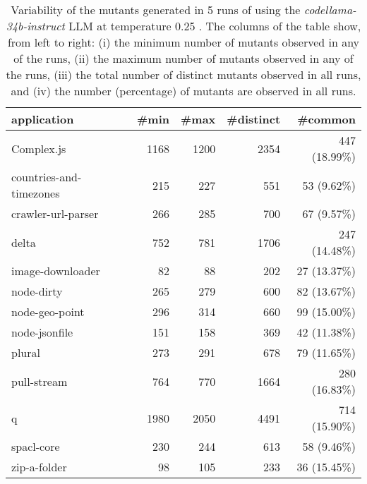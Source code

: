 
\begin{table}[hbt!]
\centering
{\footnotesize
\begin{tabular}{l|r|r|r|r}

{\bf application}  & {\bf \#min} &  {\bf \#max} &  {\bf \#distinct} & {\bf \#common}\\
\hline
Complex.js & 1168 & 1200 & 2354 & 447 (18.99\%) \\ 
countries-and-timezones & 215 & 227 & 551 & 53 (9.62\%) \\ 
crawler-url-parser & 266 & 285 & 700 & 67 (9.57\%) \\ 
delta & 752 & 781 & 1706 & 247 (14.48\%) \\ 
image-downloader & 82 & 88 & 202 & 27 (13.37\%) \\ 
node-dirty & 265 & 279 & 600 & 82 (13.67\%) \\ 
node-geo-point & 296 & 314 & 660 & 99 (15.00\%) \\ 
node-jsonfile & 151 & 158 & 369 & 42 (11.38\%) \\ 
plural & 273 & 291 & 678 & 79 (11.65\%) \\ 
pull-stream & 764 & 770 & 1664 & 280 (16.83\%) \\ 
q & 1980 & 2050 & 4491 & 714 (15.90\%) \\ 
spacl-core & 230 & 244 & 613 & 58 (9.46\%) \\ 
zip-a-folder & 98 & 105 & 233 & 36 (15.45\%) \\ 
\end{tabular}
}
\caption{
  Variability of the mutants generated in 5 runs of \ToolName using the \textit{codellama-34b-instruct} LLM
       at temperature 0.25 . The columns of the table show, from left to right:
    (i) the minimum number of mutants observed in any of the runs,
    (ii) the maximum number of mutants observed in any of the runs,
    (iii) the total number of distinct mutants observed in all runs, and
    (iv) the number (percentage) of mutants are observed in all runs.
}
\label{table:Variability_codellama-34b-instruct_0.25}
\end{table}